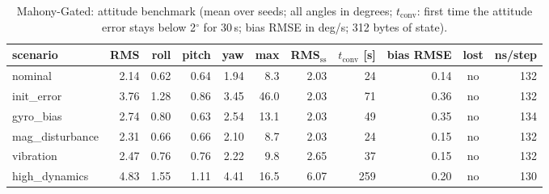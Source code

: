 \begin{table}[H]\centering\footnotesize\setlength{\tabcolsep}{3.5pt}\caption{Mahony-Gated: attitude benchmark (mean over seeds; all angles in degrees; $t_\mathrm{conv}$: first time the attitude error stays below 2$^\circ$ for 30\,s; bias RMSE in deg/s; 312 bytes of state).}\label{tab:imu_MahonyGated}
\begin{tabular}{lrrrrrrrrcr}\toprule scenario & RMS & roll & pitch & yaw & max & RMS$_\mathrm{ss}$ & $t_\mathrm{conv}$ [s] & bias RMSE & lost & ns/step \\ \midrule
nominal & 2.14 & 0.62 & 0.64 & 1.94 & 8.3 & 2.03 & 24 & 0.14 & no & 132 \\
init\_error & 3.76 & 1.28 & 0.86 & 3.45 & 46.0 & 2.03 & 71 & 0.36 & no & 132 \\
gyro\_bias & 2.74 & 0.80 & 0.63 & 2.54 & 13.1 & 2.03 & 49 & 0.35 & no & 134 \\
mag\_disturbance & 2.31 & 0.66 & 0.66 & 2.10 & 8.7 & 2.03 & 24 & 0.15 & no & 132 \\
vibration & 2.47 & 0.76 & 0.76 & 2.22 & 9.8 & 2.65 & 37 & 0.15 & no & 132 \\
high\_dynamics & 4.83 & 1.55 & 1.11 & 4.41 & 16.5 & 6.07 & 259 & 0.20 & no & 130 \\
\bottomrule\end{tabular}\end{table}
